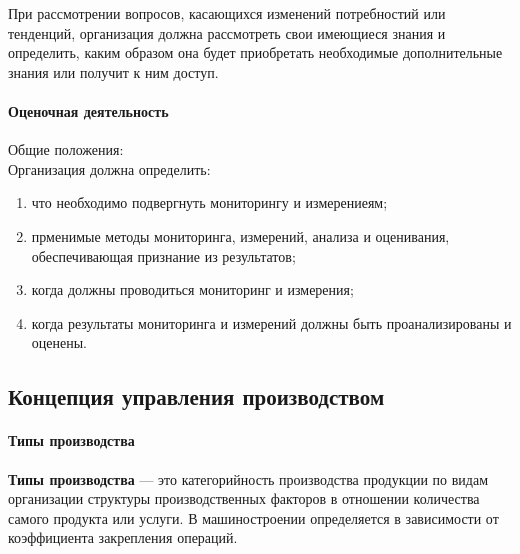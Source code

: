 При рассмотрении вопросов, касающихся изменений потребностий или тенденций,
организация должна рассмотреть свои имеющиеся знания и определить, каким образом
она будет приобретать необходимые дополнительные знания или получит к ним
доступ.

\paragraph{Оценочная деятельность}\mbox{}\par

Общие положения:\\
Организация должна определить:
\begin{enumerate}
  \item что необходимо подвергнуть мониторингу и измерениеям;
  \item прменимые методы мониторинга, измерений, анализа и оценивания,
    обеспечивающая признание из результатов;
  \item когда должны проводиться мониторинг и измерения;
  \item когда результаты мониторинга и измерений должны быть проанализированы и
    оценены.
\end{enumerate}

\subsection{Концепция управления производством}
\begin{figure}[h!]
  \centering
  \label{fig:}
\end{figure}

\paragraph{Типы производства}
\textbf{Типы производства} --- это категорийность производства продукции по
видам организации структуры производственных факторов в отношении количества
самого продукта или услуги. В машиностроении определяется в зависимости от
коэффициента закрепления операций.

